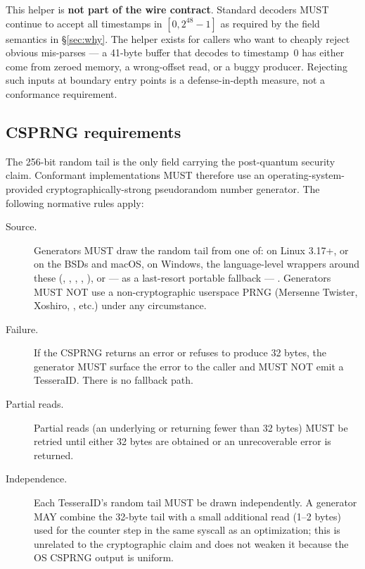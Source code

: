 This helper is \textbf{not part of the wire contract}. Standard decoders MUST continue to accept all timestamps in $[0, 2^{48} - 1]$ as required by the field semantics in §\ref{sec:why}. The helper exists for callers who want to cheaply reject obvious mis-parses — a 41-byte buffer that decodes to timestamp~0 has either come from zeroed memory, a wrong-offset read, or a buggy producer. Rejecting such inputs at boundary entry points is a defense-in-depth measure, not a conformance requirement.

\subsection{CSPRNG requirements}
\label{sec:csprng}

The 256-bit random tail is the only field carrying the post-quantum security claim. Conformant implementations MUST therefore use an operating-system-provided cryptographically-strong pseudorandom number generator. The following normative rules apply:

\begin{description}
  \item[Source.] Generators MUST draw the random tail from one of:  on Linux 3.17+,  or  on the BSDs and macOS,  on Windows, the language-level wrappers around these (, , , , ), or — as a last-resort portable fallback — . Generators MUST NOT use a non-cryptographic userspace PRNG (Mersenne Twister, Xoshiro, , etc.) under any circumstance.
  \item[Failure.] If the CSPRNG returns an error or refuses to produce 32 bytes, the generator MUST surface the error to the caller and MUST NOT emit a TesseraID. There is no fallback path.
  \item[Partial reads.] Partial reads (an underlying  or  returning fewer than 32 bytes) MUST be retried until either 32 bytes are obtained or an unrecoverable error is returned.
  \item[Independence.] Each TesseraID's random tail MUST be drawn independently. A generator MAY combine the 32-byte tail with a small additional read (1--2 bytes) used for the counter step in the same syscall as an optimization; this is unrelated to the cryptographic claim and does not weaken it because the OS CSPRNG output is uniform.
\end{description}


